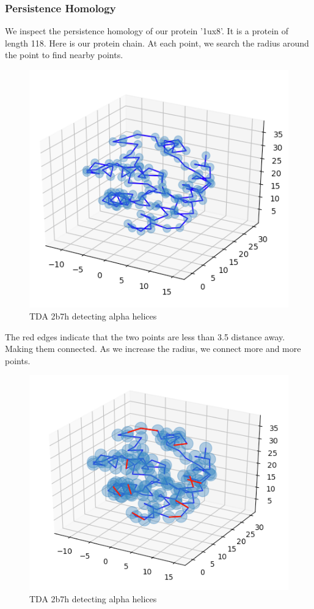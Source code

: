 \documentclass[12pt, a4paper, twocolumn, fullpage]{article}
\theoremstyle{plain}
\theoremstyle{definition}
\theoremstyle{remark}
\begin{document}
\subsubsection{Persistence Homology}
We inspect the persistence homology of our protein '1ux8'. It is a protein of length 118.
Here is our protein chain. At each point, we search the radius around the point to find nearby points.

\begin{figure}[t]
	\includegraphics[width=\linewidth]{img/hom/ballRad1.png}
	\caption{TDA 2b7h detecting alpha helices }
	\label{fig:tdahelix}
\end{figure}
The red edges indicate that the two points are less than 3.5 distance away. Making them connected.
As we increase the radius, we connect more and more points.
\begin{figure}[t]
	\includegraphics[width=\linewidth]{img/hom/ballRad2.png}
	\caption{TDA 2b7h detecting alpha helices }
	\label{fig:tdahelix}
\end{figure}
\end{document}
